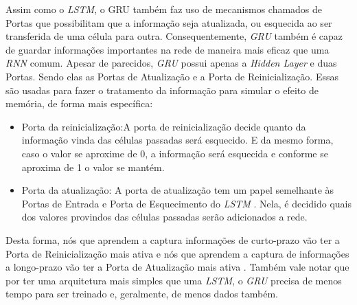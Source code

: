
Assim como o \textit{\acrshort{LSTM}}, o \acrshort{GRU} também faz uso de mecanismos chamados de Portas que possibilitam que a informação seja atualizada, ou esquecida ao ser transferida de uma célula para outra. Consequentemente, \textit{\acrshort{GRU}} também é capaz de guardar informações importantes na rede de maneira mais eficaz que uma \textit{\acrshort{RNN}} comum. Apesar de parecidos, \textit{\acrshort{GRU}} possui apenas a \textit{Hidden Layer} e duas Portas. Sendo elas as Portas de Atualização e a Porta de Reinicialização. Essas são usadas para fazer o tratamento da informação para simular o efeito de memória, de forma mais específica:

\begin{itemize}
    \item Porta da reinicialização:A porta de reinicialização decide quanto da informação vinda das células passadas será esquecido. E da mesmo forma, caso o valor se aproxime de 0, a informação será esquecida e conforme se aproxima de 1 o valor se mantém.

    \item Porta da atualização: A porta de atualização tem um papel semelhante às Portas de Entrada e Porta de Esquecimento do \textit{\acrshort{LSTM}} . Nela, é decidido quais dos valores provindos das células passadas serão adicionados a rede.
\end{itemize}

Desta forma, nós que aprendem a captura informações de curto-prazo vão ter a Porta de Reinicialização mais ativa e nós que aprendem a captura de informações a longo-prazo vão ter a Porta de Atualização mais ativa \cite{cho2014}. Também vale notar que por ter uma arquitetura mais simples que uma \textit{\acrshort{LSTM}}, o \textit{\acrshort{GRU}} precisa de menos tempo para ser treinado e, geralmente, de menos dados também.
